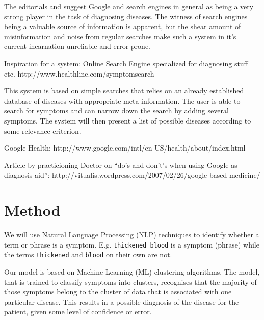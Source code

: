 \documentclass[10pt,letterpaper,final]{article}
\begin{document}
The editorials \cite{googlechangemedicine} and
\cite{diagnosissearchengines} suggest Google and search engines in
general as being a very strong player in the task of diagnosing
diseases. The witness of search engines being a valuable source of
information is apparent, but the shear amount of misinformation and
noise from regular searches make such a system in it’s current
incarnation unreliable and error prone.


Inspiration for a system: Online Search Engine specialized for
diagnosing stuff etc.
http://www.healthline.com/symptomsearch

This system is based on simple searches that relies on an already
established database of diseases with appropriate meta-information. The
user is able to search for symptoms and can narrow down the search by
adding several symptoms. The system will then present a list of possible
diseases according to some relevance criterion.



Google Health: http://www.google.com/intl/en-US/health/about/index.html


Article by practicioning Doctor on “do’s and don’t’s when using Google as
diagnosis aid”:
http://vitualis.wordpress.com/2007/02/26/google-based-medicine/


\section{Method}
We will use Natural Language Processing (NLP) techniques to identify
whether a term or phrase is a symptom. E.g. \texttt{thickened blood} is
a symptom (phrase) while the terms \texttt{thickened} and \texttt{blood}
on their own are not.

Our model is based on Machine Learning (ML) clustering algorithms. The
model, that is trained to classify symptoms into clusters, recognises
that the majority of those symptoms belong to the cluster of data that
is associated with one particular disease. This results in a possible
diagnosis of the disease for the patient, given some level of confidence
or error.
\end{document}

